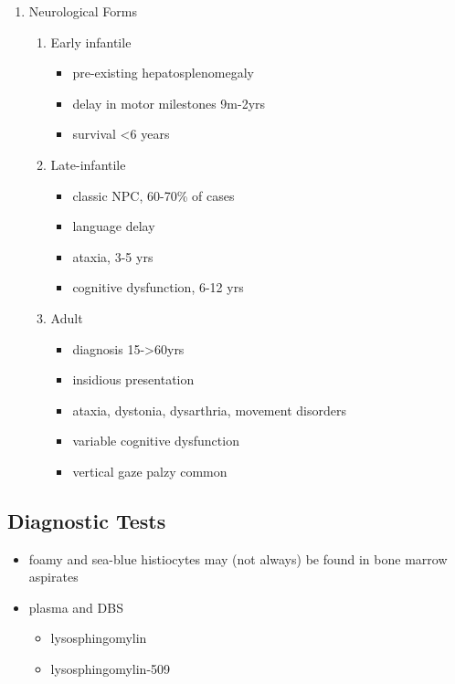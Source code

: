 \documentclass{scrartcl}
\begin{document}
\begin{enumerate}
\item Neurological Forms
\label{sec:org9a47faa}
\begin{enumerate}
\item Early infantile
\label{sec:orgbef4c85}
\begin{itemize}
\item pre-existing hepatosplenomegaly
\item delay in motor milestones 9m-2yrs
\item survival <6 years
\end{itemize}

\item Late-infantile
\label{sec:org2cdec3e}
\begin{itemize}
\item classic NPC, 60-70\% of cases
\item language delay
\item ataxia, 3-5 yrs
\item cognitive dysfunction, 6-12 yrs
\end{itemize}

\item Adult
\label{sec:org927e6f7}
\begin{itemize}
\item diagnosis 15->60yrs
\item insidious presentation
\item ataxia, dystonia, dysarthria, movement disorders
\item variable cognitive dysfunction
\item vertical gaze palzy common
\end{itemize}
\end{enumerate}
\end{enumerate}

\subsection{Diagnostic Tests}
\label{sec:org7d3a308}
\begin{itemize}
\item foamy and sea-blue histiocytes may (not always) be found in bone
marrow aspirates

\item plasma and DBS
\begin{itemize}
\item lysosphingomylin
\item lysosphingomylin-509
\end{itemize}
\end{itemize}
\end{document}
